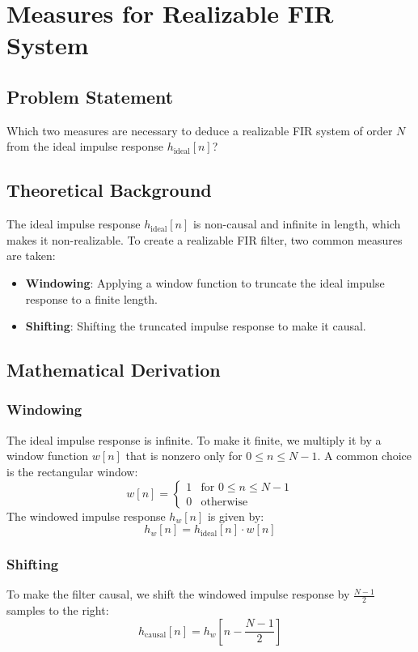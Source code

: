 \item[(c)]
\section{Measures for Realizable FIR System}

\subsection*{Problem Statement}
Which two measures are necessary to deduce a realizable FIR system of order \( N \) from the ideal impulse response \( h_{\text{ideal}}[n] \)?

\subsection*{Theoretical Background}
The ideal impulse response \( h_{\text{ideal}}[n] \) is non-causal and infinite in length, which makes it non-realizable. To create a realizable FIR filter, two common measures are taken:
\begin{itemize}
    \item \textbf{Windowing}: Applying a window function to truncate the ideal impulse response to a finite length.
    \item \textbf{Shifting}: Shifting the truncated impulse response to make it causal.
\end{itemize}

\subsection*{Mathematical Derivation}

\subsubsection*{Windowing}
The ideal impulse response is infinite. To make it finite, we multiply it by a window function \( w[n] \) that is nonzero only for \( 0 \leq n \leq N-1 \). A common choice is the rectangular window:
\[
w[n] =
\begin{cases}
1 & \text{for } 0 \leq n \leq N-1 \\
0 & \text{otherwise}
\end{cases}
\]
The windowed impulse response \( h_w[n] \) is given by:
\[
h_w[n] = h_{\text{ideal}}[n] \cdot w[n]
\]

\subsubsection*{Shifting}
To make the filter causal, we shift the windowed impulse response by \( \frac{N-1}{2} \) samples to the right:
\[
h_{\text{causal}}[n] = h_w[n - \frac{N-1}{2}]
\]

